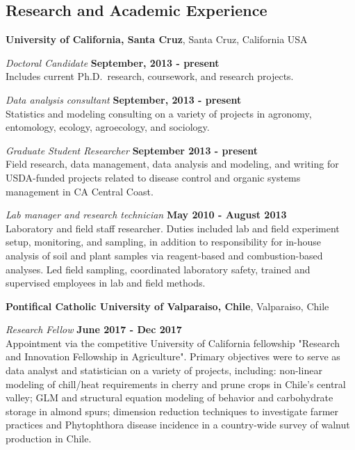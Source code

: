 \documentclass{res}
\begin{document}
\begin{resume}
		\section{\sc Research and Academic  Experience}
		{\bf University of California, Santa Cruz}, Santa Cruz, California USA
		
		\vspace{-.3cm}
		{\em Doctoral Candidate} \hfill {\bf September, 2013 - present}\\
		Includes current Ph.D.~research, coursework, and
		research projects.
	
		
		
				
		{\em Data analysis consultant} \hfill {\bf September, 2013 - present}\\
		Statistics and modeling consulting on a variety of projects in agronomy, entomology, ecology, agroecology, and sociology.
		
		{\em Graduate Student Researcher} \hfill {\bf September 2013 - present}\\
		Field research, data management, data analysis and modeling, and writing for USDA-funded projects related to disease control and organic systems management in CA Central Coast.
		
		{\em Lab manager and research technician} \hfill {\bf May 2010 - August 2013}\\
		Laboratory and field staff researcher. Duties included lab and field experiment setup, monitoring, and sampling, in addition to responsibility for in-house analysis of soil and plant samples via reagent-based and combustion-based analyses. Led field sampling, coordinated laboratory safety, trained and supervised employees in lab and field methods.     
		
	\vspace*{.05in}  
		
		{\bf Pontifical Catholic University of Valparaiso, Chile}, Valparaiso, Chile
		
		\vspace{-.3cm}		
		{\em Research Fellow} \hfill {\bf June 2017 - Dec 2017}\\
		Appointment via the competitive University of California fellowship "Research and Innovation Fellowship in Agriculture". Primary objectives were to serve as data analyst and statistician on a variety of projects, including: non-linear modeling of chill/heat requirements in cherry and prune crops in Chile's central valley; GLM and structural equation modeling of behavior and carbohydrate storage in almond spurs; dimension reduction techniques to investigate farmer practices and Phytophthora disease incidence in a country-wide survey of walnut production in Chile. 
				

\end{resume}
\end{document}
